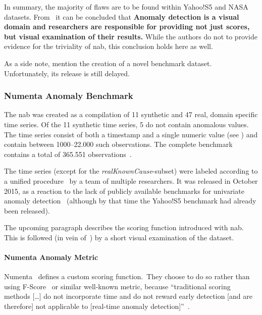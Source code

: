In summary, the majority of flaws are to be found within Yahoo!S5 and NASA datasets.
From~\cite{Renjie.2020} it can be concluded that
\textbf{Anomaly detection is a visual domain and researchers are responsible for
providing not just scores, but visual examination of their results.}
While the authors do not to provide evidence for the triviality of \gls{nab},
this conclusion holds here as well.

As a side note, \textcite{Renjie.2020} mention the creation of a novel benchmark
dataset. Unfortunately, its release is still delayed.

\subsubsection{Numenta Anomaly Benchmark}
The \acrfull{nab} was created as a compilation of 11 synthetic and 47 real,
domain specific time series. Of the 11 synthetic time series, 5 do not contain
anomalous values. The time series consist of both a timestamp and a single
numeric value (see ) and contain between 1000--22.000 such
observations. The complete benchmark contains a total of 365.551 observations~\cite{Lavin.2015}.

The time series (except for the \textit{realKnownCause}-subset) were labeled
according to a unified procedure~\cite{Numenta.2015} by a team of
multiple researchers. It was released in October 2015, as a reaction to the lack
of publicly available benchmarks for univariate anomaly detection~\cite{Lavin.2015}
(although by that time the Yahoo!S5 benchmark had already been released).

The upcoming paragraph describes the scoring function introduced with \gls{nab}.
This is followed (in vein of~\cite{Renjie.2020}) by a short visual examination
of the dataset.

\paragraph{Numenta Anomaly Metric}
Numenta~\cite{Lavin.2015} defines a custom scoring function.\ They choose to do
so rather than using F-Score~\cite[183]{Murphy.2012} or similar well-known metric,
because ``traditional scoring methods [\dots] do not incorporate time and do not
reward early detection [and are therefore] not applicable to [real-time anomaly detection]''~\cite{Lavin.2015}.

